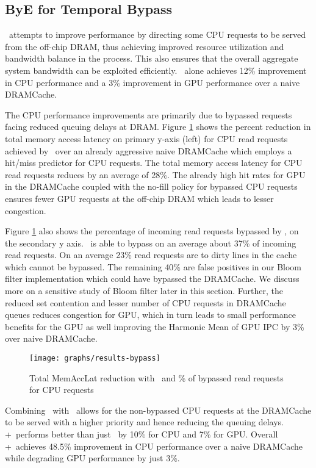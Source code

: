 \subsection{ByE for Temporal Bypass}
\bypassname\ attempts to improve performance by directing some CPU requests to be served from the off-chip DRAM, thus achieving improved resource utilization and bandwidth balance in the process. This also ensures that the overall aggregate system bandwidth can be exploited efficiently. \bypassname\ alone achieves 12\% improvement in CPU performance and a 3\% improvement in GPU performance over a naive DRAMCache.
\par The CPU performance improvements are primarily due to bypassed requests facing reduced queuing delays at DRAM. Figure \ref{results-bloom} shows the percent reduction in total memory access latency on primary y-axis (left) for CPU read requests achieved by \bypassname\ over an already aggressive naive DRAMCache which employs a hit/miss predictor for CPU requests. The total memory access latency for CPU read requests reduces by an average of 28\%. The already high hit rates for GPU in the DRAMCache coupled with the no-fill policy for bypassed CPU requests ensures fewer GPU requests at the off-chip DRAM which leads to lesser congestion. 
\par Figure \ref{results-bloom} also shows the percentage of incoming read requests bypassed by \bypassname, on the secondary y axis. 
\bypassname\ is able to bypass on an average about 37\% of incoming read requests. On an average 23\% read requests are to dirty lines in the cache which cannot be bypassed.  The remaining 40\% are false positives in our Bloom filter implementation which could have bypassed the DRAMCache. We discuss more on a sensitive study of Bloom filter later in this section. Further, the reduced set contention and lesser number of CPU requests in DRAMCache queues reduces congestion for GPU, which in turn leads to small performance benefits for the GPU as well improving the Harmonic Mean of GPU IPC by 3\% over naive DRAMCache.

\begin{figure}[!htb]
    \centering
    \texttt{[image: graphs/results-bypass]}
    \caption{Total MemAccLat reduction with \bypassname\ and \% of bypassed read requests for CPU requests}
    \label{results-bloom}
\end{figure}

\par Combining \prioname\ with \bypassname\ allows for the non-bypassed CPU requests at the DRAMCache to be served with a higher priority and hence reducing the queuing delays. \bypassname+\prioname\ performs better than just \prioname\ by 10\% for CPU and 7\% for GPU. Overall \bypassname+\prioname\ achieves 48.5\% improvement in CPU performance over a naive DRAMCache while degrading GPU performance by just 3\%.


